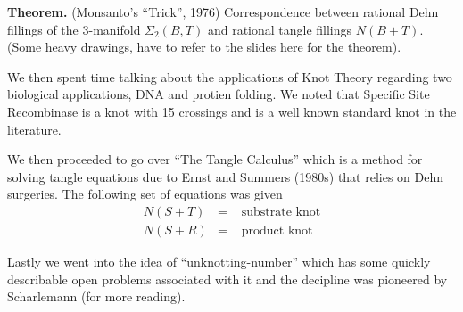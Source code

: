 \documentclass[12pt]{amsart}
\theoremstyle{definition}
\begin{document}
\begin{onehalfspace}
        \noindent\textbf{Theorem.} (Monsanto's ``Trick'', 1976) Correspondence between rational Dehn fillings of
        the 3-manifold $\Sigma_2(B, T)$ and rational tangle fillings $N(B + T)$.
        (Some heavy drawings, have to refer to the slides here for the theorem).

        We then spent time talking about the applications of Knot Theory regarding two biological applications,
        DNA and protien folding. We noted that Specific Site Recombinase is a knot with 15 crossings and is a
        well known standard knot in the literature.

        We then proceeded to go over ``The Tangle Calculus'' which is a method for solving tangle equations due to
        Ernst and Summers (1980s) that relies on Dehn surgeries. The following set of equations was given
        \begin{eqnarray*}
            N(S + T) & = & \text{ substrate knot} \\
            N(S + R) & = & \text{ product knot}
        \end{eqnarray*}

        Lastly we went into the idea of ``unknotting-number'' which has some quickly describable open problems
        associated with it and the decipline was pioneered by Scharlemann (for more reading).
    \end{onehalfspace}
\end{document}
